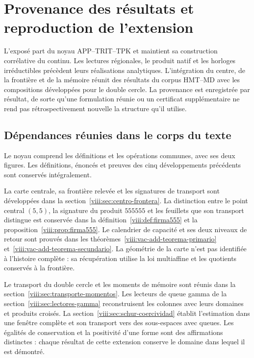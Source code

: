 \section{Provenance des résultats et reproduction de l'extension}
\label{viii:ap:procedencia-reproduccion}
\begingroup
\setlength{\parskip}{1pt}

L'exposé part du noyau APP--TRIT--TPK et maintient sa construction
corrélative du continu. Les lectures régionales, le produit natif et les
horloges irréductibles précèdent leurs réalisations analytiques. L'intégration
du centre, de la frontière et de la mémoire réunit des résultats du corpus HMT--MD avec
les compositions développées pour le double cercle. La provenance est
enregistrée par résultat, de sorte qu'une formulation réunie ou un certificat
supplémentaire ne rend pas rétrospectivement nouvelle la structure qu'il utilise.

\subsection{Dépendances réunies dans le corps du texte}

Le noyau comprend les définitions et les opérations communes, avec
ses deux figures. Les définitions, énoncés et preuves des cinq
développements précédents sont conservés intégralement.

La carte centrale, sa frontière relevée et les signatures de transport sont développées dans la section~\ref{viii:sec:centro-frontera}. La distinction entre le point central \((5,5)\), la signature du produit \(555555\) et les feuillets que son transport distingue est conservée dans la définition~\ref{viii:def:firma555} et la proposition~\ref{viii:prop:firma555}. Le calendrier de capacité et ses deux niveaux de retour sont prouvés dans les théorèmes~\ref{viii:vac-add-teorema-primario} et~\ref{viii:vac-add-teorema-secundario}. La géométrie de la carte n'est pas identifiée à l'histoire complète : sa récupération utilise la loi multiaffine et les quotients conservés à la frontière.

Le transport du double cercle et les moments de mémoire sont réunis dans
la section~\ref{viii:sec:transporte-momentos}. Les lecteurs de queue gamma de
la section~\ref{viii:sec:lectores-gamma} reconstruisent les colonnes avec leurs
domaines et produits croisés. La section~\ref{viii:sec:schur-coercividad}
établit l'estimation dans une fenêtre complète et son transport vers
des sous-espaces avec queues. Les égalités de conservation et la positivité
d'une forme sont des affirmations distinctes : chaque résultat de cette extension
conserve le domaine dans lequel il est démontré.

